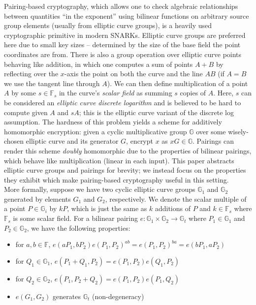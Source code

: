 \noindent Pairing-based cryptography, which allows one to check algebraic relationships between quantities ``in the exponent'' using bilinear functions on arbitrary source group elements (usually from elliptic curve groups), is a heavily used cryptographic primitive in modern SNARKs. Elliptic curve groups are preferred here due to small key sizes -- determined by the size of the base field the point coordinates are from. There is also a group operation over elliptic curve points behaving like addition, in which one computes a sum of points $A + B$ by reflecting over the $x$-axis the point on both the curve and the line $AB$ (if $A = B$ we use the tangent line through $A$). We can then define multiplication of a point $A$ by some $s \in \mathbb{F}_s$ in the curve's \textit{scalar field} as summing $s$ copies of $A$. Here, $s$ can be considered an \textit{elliptic curve discrete logarithm} and is believed to be hard to compute given $A$ and $sA$; this is the elliptic curve variant of the discrete log assumption. The hardness of this problem yields a scheme for additively homomorphic encryption: given a cyclic multiplicative group $\mathbb{G}$ over some wisely-chosen elliptic curve and its generator $G$, encrypt $x$ as $xG \in \mathbb{G}$. Pairings can render this scheme \textit{doubly} homomorphic due to the properties of bilinear pairings, which behave like multiplication (linear in each input). This paper abstracts elliptic curve groups and pairings for brevity; we instead focus on the properties they exhibit which make pairing-based cryptography useful in this setting.\\

\noindent More formally, suppose we have two cyclic elliptic curve groups $\mathbb{G}_1$ and $\mathbb{G}_2$ generated by elements $G_1$ and $G_2$, respectively. We denote the scalar multiple of a point $P \in \mathbb{G}_i$ by $kP$, which is just the same as $k$ additions of $P$ and $k \in \mathbb{F}_s$ where $\mathbb{F}_s$ is some scalar field. For a bilinear pairing $e: \mathbb{G}_1 \times \mathbb{G}_2 \to \mathbb{G}_t$ where $P_1 \in \mathbb{G}_1$ and $P_2 \in \mathbb{G}_2$, we have the following properties:
\begin{itemize}
    \item for $a, b \in \mathbb{F}$, $e(aP_1, bP_2) e(P_1, P_2)^{ab} = e(P_1, P_2)^{ba} = e(bP_1, aP_2)$
    \item for $Q_1 \in \mathbb{G}_1$, $e(P_1+Q_1, P_2) = e(P_1, P_2) e(Q_1, P_2)$
    \item for $Q_2 \in \mathbb{G}_2$, $e(P_1, P_2+Q_2) = e(P_1, P_2) e(P_1, Q_2)$
    \item $e(G_1, G_2)$ generates $\mathbb{G}_t$ (non-degeneracy)
\end{itemize}


